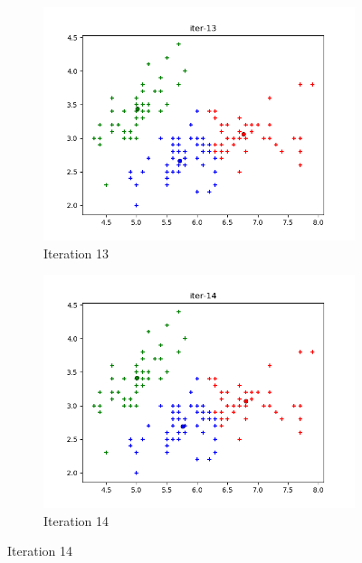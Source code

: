 \documentclass[french]{article}
\begin{document}
\begin{figure}[h!]
\centering
\begin{subfigure}{.5\textwidth}
  \centering
  \includegraphics[width=\linewidth]{img/iter-13.png}
  \caption{Iteration 13}
\end{subfigure}%
\begin{subfigure}{.5\textwidth}
  \centering
  \includegraphics[width=\linewidth]{img/iter-14.png}
  \caption{Iteration 14}
\end{subfigure}%
\end{figure}
\end{document}
